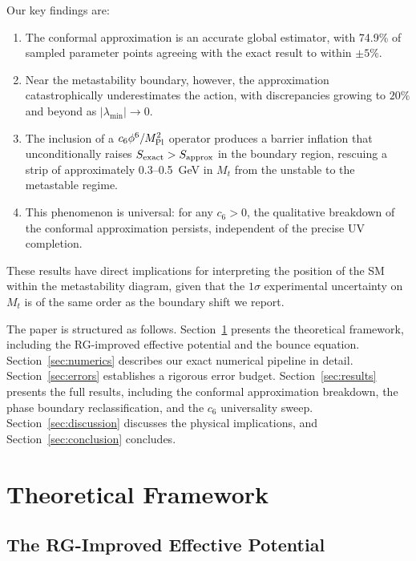 \documentclass[aps,prd,twocolumn,superscriptaddress,nofootinbib]{revtex4-2}
\begin{document}
Our key findings are:
\begin{enumerate}
  \item The conformal approximation is an accurate global estimator, with
  74.9\% of sampled parameter points agreeing with the exact result to
  within $\pm 5\%$.
  \item Near the metastability boundary, however, the approximation
  catastrophically underestimates the action, with discrepancies growing
  to $20\%$ and beyond as $|\lambda_{\min}| \to 0$.
  \item The inclusion of a $c_6\phi^6/M_{\rm Pl}^2$ operator produces a
  barrier inflation that unconditionally raises $S_{\rm exact} > S_{\rm approx}$
  in the boundary region, rescuing a strip of approximately 0.3--0.5~GeV in
  $M_t$ from the unstable to the metastable regime.
  \item This phenomenon is universal: for any $c_6 > 0$, the qualitative
  breakdown of the conformal approximation persists, independent of the
  precise UV completion.
\end{enumerate}

These results have direct implications for interpreting the position of the
SM within the metastability diagram, given that the $1\sigma$ experimental
uncertainty on $M_t$ is of the same order as the boundary shift we report.

The paper is structured as follows. Section~\ref{sec:theory} presents the
theoretical framework, including the RG-improved effective potential and the
bounce equation. Section~\ref{sec:numerics} describes our exact numerical
pipeline in detail. Section~\ref{sec:errors} establishes a rigorous error
budget. Section~\ref{sec:results} presents the full results, including the
conformal approximation breakdown, the phase boundary reclassification, and
the $c_6$ universality sweep. Section~\ref{sec:discussion} discusses the
physical implications, and Section~\ref{sec:conclusion} concludes.

\section{Theoretical Framework}
\label{sec:theory}

\subsection{The RG-Improved Effective Potential}
\label{subsec:potential}
\end{document}
